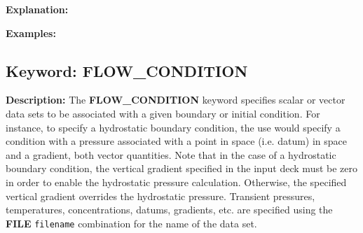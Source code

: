 \documentclass[12pt]{article}
\begin{document}
{\noindent\bf Explanation:}

\bigskip

{\noindent\bf Examples:}


\newpage
\protect\hypertarget{target_flow_cond}{}

\subsection{Keyword: FLOW\_CONDITION}

{\noindent\bf Description:}
The {\bf FLOW\_CONDITION} keyword specifies scalar or vector data sets to be associated with a given boundary or initial condition.  For instance, to specify a hydrostatic boundary condition, the use would specify a condition with a pressure associated with a point in space (i.e. datum) in space and a gradient, both vector quantities.  Note that in the case of a hydrostatic boundary condition, the vertical gradient specified in the input deck must be zero in order to enable the hydrostatic pressure calculation.  Otherwise, the specified vertical gradient overrides the hydrostatic pressure.  Transient pressures, temperatures, concentrations, datums, gradients, etc. are specified using the {\bf FILE} {\tt filename} combination for the name of the data set.
\end{document}
